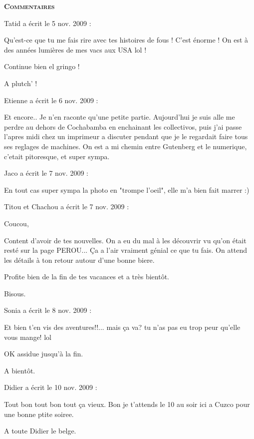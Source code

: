 \bigskip
\textbf{\textsc{Commentaires}}

\medskip
Tatid a écrit le 5 nov. 2009 :
\begin{displayquote}
Qu'est-ce que tu me fais rire avec tes histoires de fous ! C'est énorme ! On est à des années lumières de mes vacs aux USA lol !

Continue bien el gringo !

A plutch' !
\end{displayquote}

\medskip
Etienne a écrit le 6 nov. 2009 :
\begin{displayquote}
Et encore.. Je n'en raconte qu'une petite partie. Aujourd'hui je suis alle me perdre au dehors de Cochabamba en enchainant les collectivos, puis j'ai passe l'apres midi chez un imprimeur a discuter pendant que je le regardait faire tous ses reglages de machines. On est a mi chemin entre Gutenberg et le numerique, c'etait pitoresque, et super sympa.
\end{displayquote}

\medskip
Jaco a écrit le 7 nov. 2009 :
\begin{displayquote}
En tout cas super sympa la photo en "trompe l'oeil", elle m'a bien fait marrer :)
\end{displayquote}

\medskip
Titou et Chachou a écrit le 7 nov. 2009 :
\begin{displayquote}
Coucou,

Content d'avoir de tes nouvelles. On a eu du mal à les découvrir vu qu'on était resté sur la page PEROU... Ça a l'air vraiment génial ce que tu fais. On attend les détails à ton retour autour d'une bonne biere.

Profite bien de la fin de tes vacances et a très bientôt.

Bisous.
\end{displayquote}

\medskip
Sonia a écrit le 8 nov. 2009 :
\begin{displayquote}
Et bien t'en vis des aventures!!... mais ça va? tu n'as pas eu trop peur qu'elle vous mange! lol

OK assidue jusqu'à la fin.

A bientôt.
\end{displayquote}

\medskip
Didier a écrit le 10 nov. 2009 :
\begin{displayquote}
Tout bon tout bon tout ça vieux. Bon je t'attends le 10 au soir ici a Cuzco pour une bonne ptite soiree.

A toute
Didier le belge.
\end{displayquote}

